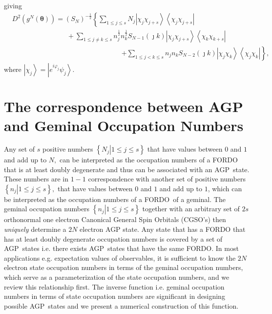 \documentclass[aps,preprint]{revtex4}%
\begin{document}
giving
\begin{align}
&  D^{2}\left(  g^{N}\left(  \mathbf{\theta}\right)  \right)  =\left(
S_{N}\right)  ^{-\frac{1}{2}}\left\{  \sum_{1\leq j\leq s}N_{j}\left\vert
\chi_{j}\chi_{j+s}\right\rangle \left\langle \chi_{j}\chi_{j+s}\right\vert
\right. \nonumber\\
&  \qquad\qquad\qquad\qquad+\sum_{1\leq j\neq k\leq s}n_{j}^{\frac{1}{2}}%
n_{k}^{\frac{1}{2}}S_{N-1}\left(  \jmath k\right)  \left\vert \chi_{j}%
\chi_{j+s}\right\rangle \left\langle \chi_{k}\chi_{k+s}\right\vert \nonumber\\
&  \qquad\qquad\qquad\qquad\qquad\qquad\qquad\qquad\left.  +\sum_{1\leq
j<k\leq s}n_{j}n_{k}S_{N-2}\left(  \jmath k\right)  \left\vert \chi_{j}%
\chi_{k}\right\rangle \left\langle \chi_{j}\chi_{k}\right\vert \right\}  ,
\end{align}
where $\left\vert \chi_{j}\right\rangle =\left\vert e^{i\varphi_{j}}\psi
_{j}\right\rangle .$

\section{The correspondence between AGP and Geminal Occupation
Numbers\label{transform}}

Any set of $s$ positive numbers $\left\{  \left.  N_{j}\right\vert 1\leq j\leq
s\right\}  $ that have values between $0$ and $1$ and add up to $N,$ can be
interpreted as the occupation numbers of a FORDO that is at least doubly
degenerate and thus can be associated with an AGP\ state. These numbers are in
$1-1$ correspondence with another set of positive numbers $\left\{  \left.
n_{j}\right\vert 1\leq j\leq s\right\}  ,$ that have values between $0$ and
$1$ and add up to $1$, which can be interpreted as the occupation numbers of a
FORDO\ of a geminal. The geminal occupation numbers $\left\{  \left.
n_{j}\right\vert 1\leq j\leq s\right\}  $ together with an arbitrary set of
$2s$ orthonormal one electron Canonical General Spin Orbitals (CGSO's) then
\emph{uniquely }determine a $2N$ electron AGP state. Any state that has a
FORDO that has at least doubly degenerate occupation numbers is covered by a
set of AGP\ states i.e. there exists AGP\ states that have the same FORDO. In
most applications e.g. expectation values of observables, it is sufficient to
know the $2N$ electron state occupation numbers in terms of the geminal
occupation numbers, which serve as a parameterization of the state occupation
numbers, and we review this relationship first. The inverse function i.e.
geminal occupation numbers in terms of state occupation numbers are
significant in designing possible AGP\ states and we present a numerical
construction of this function.
\end{document}
